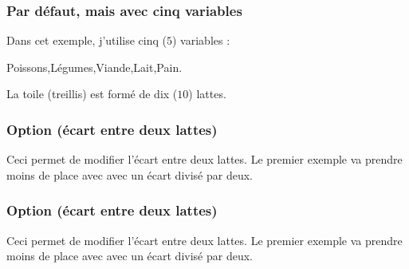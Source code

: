 \documentclass[DIV         = 12,
               fontsize    = 10,
               headinclude = false,
               index       = totoc,
               footinclude = false,
               twoside,
               headings    = small
               ]{tkz-doc}
\begin{document}
\subsubsection{Par défaut, mais avec cinq variables}   
Dans cet exemple, j'utilise cinq ($5$) variables : 

  Poissons,Légumes,Viande,Lait,Pain. 
  
 La toile (treillis)  est formé de dix ($10$)  lattes.

\bigskip   
\begin{tkzexample}
\end{tkzexample}  

   
\begin{center}
\end{center}

\subsubsection{Option  (écart entre deux lattes)}
Ceci permet de modifier l'écart entre deux lattes. Le premier exemple va prendre moins de place avec avec un écart divisé par deux.


\begin{tkzexample}[width=9cm]
\end{tkzexample} 

\subsubsection{Option  (écart entre deux lattes)}
Ceci permet de modifier l'écart entre deux lattes. Le premier exemple va prendre moins de place avec avec un écart divisé par deux.

\begin{tkzexample}[width=7cm]
\end{tkzexample}
\end{document}

